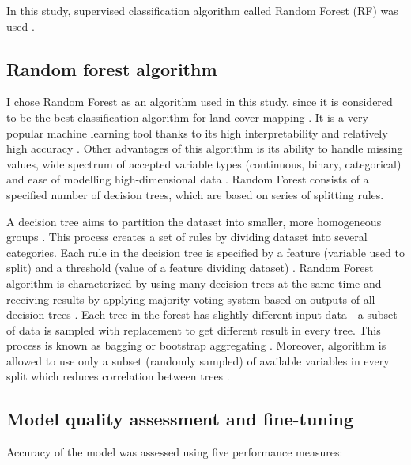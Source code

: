 \documentclass{amuthesis}
\begin{document}
In this study, supervised classification algorithm called Random Forest
(RF) was used \autocite{breiman_random_2001}.

\hypertarget{sec-rf}{%
\subsection{Random forest algorithm}\label{sec-rf}}

I chose Random Forest as an algorithm used in this study, since it is
considered to be the best classification algorithm for land cover
mapping \autocite{talukdar_land-use_2020}. It is a very popular machine
learning tool thanks to its high interpretability and relatively high
accuracy \autocite{qi_random_2012}. Other advantages of this algorithm
is its ability to handle missing values, wide spectrum of accepted
variable types (continuous, binary, categorical) and ease of modelling
high-dimensional data \autocite{qi_random_2012}. Random Forest consists
of a specified number of decision trees, which are based on series of
splitting rules.

A decision tree aims to partition the dataset into smaller, more
homogeneous groups \autocite{kuhn_applied_2013}. This process creates a
set of rules by dividing dataset into several categories. Each rule in
the decision tree is specified by a feature (variable used to split) and
a threshold (value of a feature dividing dataset)
\autocite{sekulic_random_2020}. Random Forest algorithm is characterized
by using many decision trees at the same time and receiving results by
applying majority voting system based on outputs of all decision trees
\autocite{kuhn_applied_2013}. Each tree in the forest has slightly
different input data - a subset of data is sampled with replacement to
get different result in every tree. This process is known as bagging or
bootstrap aggregating \autocite{schonlau_random_2020}. Moreover,
algorithm is allowed to use only a subset (randomly sampled) of
available variables in every split which reduces correlation between
trees \autocite{sohil_introduction_2022}.

\hypertarget{sec-resampling}{%
\subsection{Model quality assessment and
fine-tuning}\label{sec-resampling}}

Accuracy of the model was assessed using five performance measures:
\end{document}
